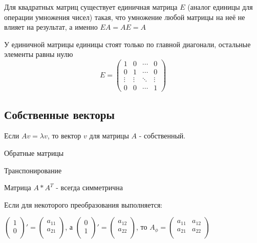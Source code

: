 \documentclass{article}
\begin{document}
Для квадратных матриц существует единичная матрица $E$ (аналог единицы для операции умножения чисел) такая,
что умножение любой матрицы на неё не влияет на результат, а именно $EA=AE=A$

У единичной матрицы единицы стоят только по главной диагонали, остальные элементы равны нулю
$$E=\begin{pmatrix}1&0&\cdots &0\\0&1&\cdots &0\\\vdots &\vdots &\ddots &\vdots \\0&0&\cdots &1\end{pmatrix}$$

\subsection*{Собственные векторы}

Если $Av = \lambda v$, то вектор $v$ для матрицы $A$ - собственный.

Обратные матрицы

Транспонирование

Матрица $A*A^T$ - всегда симметрична

Если для некоторого преобразования выполняется:

 $\begin{pmatrix}
	1\\
	0\\
\end{pmatrix}' = \begin{pmatrix}
	a_{11}\\
	a_{21}\\
\end{pmatrix}$, а 
$\begin{pmatrix}
	0\\
	1\\
\end{pmatrix}' = \begin{pmatrix}
	a_{12}\\
	a_{22}\\
\end{pmatrix}$, то 
$A_{\phi} = \begin{pmatrix}
	a_{11} & a_{12}\\
	a_{21} & a_{22}\\
\end{pmatrix}$
\end{document}
